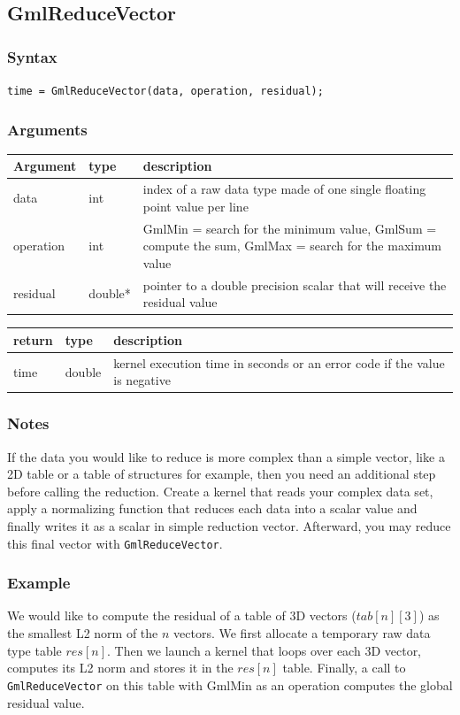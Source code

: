 \documentclass[a4paper,12pt]{article}
\begin{document}
\subsection{GmlReduceVector}
\subsubsection*{Syntax}
{\tt time = GmlReduceVector(data, operation, residual);}
\subsubsection*{Arguments}

\begin{tabular}{|m{2cm}|m{1.5cm}|m{10.5cm}|}
\hline
Argument   & type    & description \\
\hline
data       & int     & index of a raw data type made of one single floating point value per line \\
\hline
operation  & int     & GmlMin = search for the minimum value, GmlSum = compute the sum, GmlMax = search for the maximum value \\
\hline
residual   & double* & pointer to a double precision scalar that will receive the residual value \\
\hline
\end{tabular}

\medskip

\begin{tabular}{|m{2cm}|m{1.5cm}|m{10.5cm}|}
\hline
return     & type   & description \\
\hline
time       & double & kernel execution time in seconds or an error code if the value is negative \\
\hline
\end{tabular}
\subsubsection*{Notes}
If the data you would like to reduce is more complex than a simple vector, like a 2D table or a table of structures for example, then you need an additional step before calling the reduction. Create a kernel that reads your complex data set, apply a normalizing function that reduces each data into a scalar value and finally writes it as a scalar in simple reduction vector. Afterward, you may reduce this final vector with {\tt GmlReduceVector}.

\subsubsection*{Example}
We would like to compute the residual of a table of 3D vectors ($tab[n][3]$) as the smallest L2 norm of the $n$ vectors. We first allocate a temporary raw data type table $res[n]$. Then we launch a kernel that loops over each 3D vector, computes its L2 norm and stores it in the $res[n]$ table. Finally, a call to {\tt GmlReduceVector} on this table with GmlMin as an operation computes the global residual value.
\end{document}

